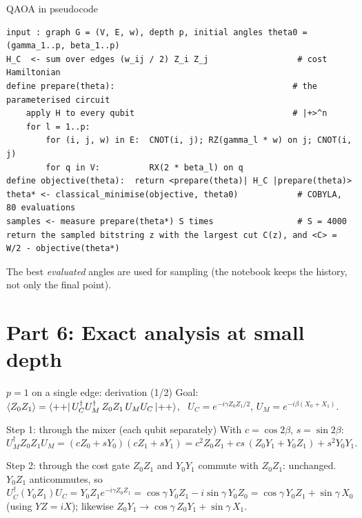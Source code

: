 \documentclass[aspectratio=169,11pt]{beamer}
\begin{document}
\begin{frame}[fragile]{QAOA in pseudocode}
\begin{lstlisting}[language={}]
input : graph G = (V, E, w), depth p, initial angles theta0 = (gamma_1..p, beta_1..p)
H_C  <- sum over edges (w_ij / 2) Z_i Z_j                  # cost Hamiltonian
define prepare(theta):                                    # the parameterised circuit
    apply H to every qubit                                # |+>^n
    for l = 1..p:
        for (i, j, w) in E:  CNOT(i, j); RZ(gamma_l * w) on j; CNOT(i, j)
        for q in V:          RX(2 * beta_l) on q
define objective(theta):  return <prepare(theta)| H_C |prepare(theta)>
theta* <- classical_minimise(objective, theta0)            # COBYLA, 80 evaluations
samples <- measure prepare(theta*) S times                 # S = 4000
return the sampled bitstring z with the largest cut C(z), and <C> = W/2 - objective(theta*)
\end{lstlisting}
  \small The best \emph{evaluated} angles are used for sampling (the notebook keeps the history, not only the final point).
\end{frame}

\section{Part 6: Exact analysis at small depth}
\begin{frame}{$p = 1$ on a single edge: derivation (1/2)}
  Goal: $\langle Z_0Z_1\rangle = \bra{++}U_C^\dagger U_M^\dagger\,Z_0Z_1\,U_MU_C\ket{++}$, \ $U_C = e^{-i\gamma Z_0Z_1/2}$, $U_M = e^{-i\beta(X_0+X_1)}$.
  \begin{block}{Step 1: through the mixer (each qubit separately)}
    With $c = \cos2\beta$, $s = \sin2\beta$:
    \[ U_M^\dagger Z_0Z_1U_M = (cZ_0 + sY_0)(cZ_1 + sY_1) = c^2Z_0Z_1 + cs\,(Z_0Y_1 + Y_0Z_1) + s^2Y_0Y_1 . \]
  \end{block}
  \begin{block}{Step 2: through the cost gate}
    $Z_0Z_1$ and $Y_0Y_1$ commute with $Z_0Z_1$: unchanged. $Y_0Z_1$ anticommutes, so
    \[ U_C^\dagger(Y_0Z_1)U_C = Y_0Z_1e^{-i\gamma Z_0Z_1} = \cos\gamma\,Y_0Z_1 - i\sin\gamma\,Y_0Z_0 = \cos\gamma\,Y_0Z_1 + \sin\gamma\,X_0 \]
    (using $YZ = iX$); likewise $Z_0Y_1 \to \cos\gamma\,Z_0Y_1 + \sin\gamma\,X_1$.
  \end{block}
\end{frame}
\end{document}
